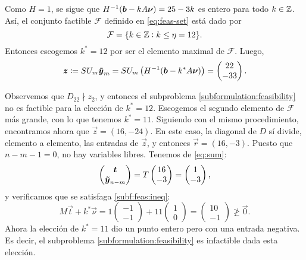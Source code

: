 \begin{example}
	Como $H = 1$, se sigue que $H^{-1} (\boldsymbol{b} - kA\boldsymbol{\nu}) = 25 - 3k$ es entero para todo $k
	\in \mathbb{Z}$. Así, el conjunto factible $\mathcal{F}$ definido en \ref{eq:feas-set} está dado por
	\begin{equation*}
		\mathcal{F} 
		= \lbrace k \in \mathbb{Z} \vcentcolon k \leq \eta = 12 \rbrace.
	\end{equation*}
	Entonces escogemos $k^* = 12$ por ser el elemento maximal de $\mathcal{F}$. Luego,
	\begin{equation*}
		\boldsymbol{z} \coloneq SU_m\boldsymbol{\tilde{y}}_m = SU_m \left(H^{-1} (\boldsymbol{b} - k^*A\boldsymbol{\nu})\right)
		= \begin{pmatrix} 22 \\ -33 \end{pmatrix}.
	\end{equation*}

	Observemos que $D_{22} \nmid z_2$, y entonces el subproblema \eqref{subformulation:feasibility}
	no es factible para la elección de $k^* = 12$. Escogemos el segundo elemento de $\mathcal{F}$
	más grande, con lo que tenemos $k^* = 11$. Siguiendo con el mismo procedimiento, encontramos
	ahora que $\vec{z} = (16, -24)$. En este caso, la diagonal de $D$ sí divide, elemento a elemento,
	las entradas de $\vec{z}$, y entonces $\vec{r} = (16, -3)$. Puesto que $n - m - 1 = 0$, no hay
	variables libres. Tenemos de \eqref{eq:sum}:
	\begin{equation*}
		\begin{pmatrix} \boldsymbol{t} \\ \boldsymbol{\tilde{y}}_{n-m} \end{pmatrix} = T
		\begin{pmatrix} 16 \\ -3 \end{pmatrix} = \begin{pmatrix} 1 \\ -3 \end{pmatrix},
	\end{equation*}
	y verificamos que se satisfaga \eqref{subf:feas:ineq}:
	\begin{equation*}
		M\vec{t} + k^*\vec{\nu}
		= 1 \begin{pmatrix} -1 \\ -1 \end{pmatrix} + 11 \begin{pmatrix} 1 \\ 0 \end{pmatrix}
		= \begin{pmatrix} 10 \\ -1 \end{pmatrix} \not \geq \vec{0}.
	\end{equation*}
	Ahora la elección de $k^* = 11$ dio un punto entero pero con una entrada negativa. Es decir, el
	subproblema \eqref{subformulation:feasibility} es infactible dada esta elección.


\end{example}
